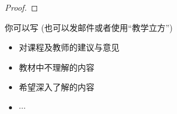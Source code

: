 \documentclass[a4paper, justified]{tufte-handout}
\begin{document}
\begin{proof}
\end{proof}

\begincorrection

\beginfb

你可以写 (也可以发邮件或者使用``教学立方'')
\begin{itemize}
  \item 对课程及教师的建议与意见
  \item 教材中不理解的内容
  \item 希望深入了解的内容
  \item $\cdots$
\end{itemize}
\end{document}
